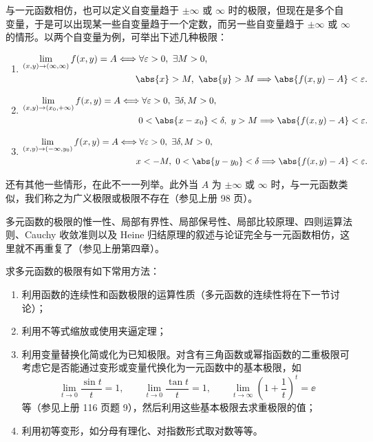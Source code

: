 与一元函数相仿，也可以定义自变量趋于 $\pm\infty$ 或 $\infty$ 时的极限，但现在是多个自变量，于是可以出现某一些自变量趋于一个定数，而另一些自变量趋于 $\pm\infty$ 或 $\infty$ 的情形。以两个自变量为例，可举出下述几种极限：
\begin{enumerate}[label=(\arabic*)]
  \item
  \[
  \begin{aligned}
    \lim_{(x,y)\to(\infty,\infty)}f(x,y)=A
    &\Longleftrightarrow \forall\varepsilon>0,\ \exists M>0,\\
    &\qquad \abs{x}>M,\ \abs{y}>M
    \Longrightarrow \abs{f(x,y)-A}<\varepsilon.
  \end{aligned}
  \]
  \item
  \[
  \begin{aligned}
    \lim_{(x,y)\to(x_0,+\infty)}f(x,y)=A
    &\Longleftrightarrow \forall\varepsilon>0,\ \exists\delta,M>0,\\
    &\qquad 0<\abs{x-x_0}<\delta,\ y>M
    \Longrightarrow \abs{f(x,y)-A}<\varepsilon.
  \end{aligned}
  \]
  \item
  \[
  \begin{aligned}
    \lim_{(x,y)\to(-\infty,y_0)}f(x,y)=A
    &\Longleftrightarrow \forall\varepsilon>0,\ \exists\delta,M>0,\\
    &\qquad x<-M,\ 0<\abs{y-y_0}<\delta
    \Longrightarrow \abs{f(x,y)-A}<\varepsilon.
  \end{aligned}
  \]
\end{enumerate}
还有其他一些情形，在此不一一列举。此外当 $A$ 为 $\pm\infty$ 或 $\infty$ 时，与一元函数类似，我们称之为广义极限或极限不存在（参见上册 98 页）。

多元函数的极限的惟一性、局部有界性、局部保号性、局部比较原理、四则运算法则、Cauchy 收敛准则以及 Heine 归结原理的叙述与论证完全与一元函数相仿，这里就不再重复了（参见上册第四章）。

求多元函数的极限有如下常用方法：
\begin{enumerate}[label=\arabic*.]
  \item 利用函数的连续性和函数极限的运算性质（多元函数的连续性将在下一节讨论）；
  \item 利用不等式缩放或使用夹逼定理；
  \item 利用变量替换化简或化为已知极限。对含有三角函数或幂指函数的二重极限可考虑它是否能通过变形或变量代换化为一元函数中的基本极限，如
  \[
    \lim_{t\to0}\frac{\sin t}{t}=1,\qquad
    \lim_{t\to0}\frac{\tan t}{t}=1,\qquad
    \lim_{t\to\infty}\left(1+\frac1t\right)^t=\ee
  \]
  等（参见上册 116 页题 9），然后利用这些基本极限去求重极限的值；
  \item 利用初等变形，如分母有理化、对指数形式取对数等等。
\end{enumerate}

